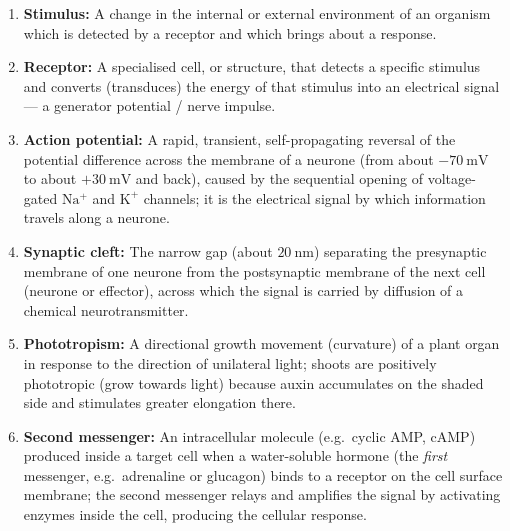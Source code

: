 \documentclass[11pt]{article}
\begin{document}
\begin{corrige}
\begin{enumerate}
\item \textbf{Stimulus:} A change in the internal or external environment of an organism which is detected by a receptor and which brings about a response.

\item \textbf{Receptor:} A specialised cell, or structure, that detects a specific stimulus and converts (transduces) the energy of that stimulus into an electrical signal — a generator potential / nerve impulse.

\item \textbf{Action potential:} A rapid, transient, self-propagating reversal of the potential difference across the membrane of a neurone (from about $-70\ \mathrm{mV}$ to about $+30\ \mathrm{mV}$ and back), caused by the sequential opening of voltage-gated $\mathrm{Na^+}$ and $\mathrm{K^+}$ channels; it is the electrical signal by which information travels along a neurone.

\item \textbf{Synaptic cleft:} The narrow gap (about $20\ \mathrm{nm}$) separating the presynaptic membrane of one neurone from the postsynaptic membrane of the next cell (neurone or effector), across which the signal is carried by diffusion of a chemical neurotransmitter.

\item \textbf{Phototropism:} A directional growth movement (curvature) of a plant organ in response to the direction of unilateral light; shoots are positively phototropic (grow towards light) because auxin accumulates on the shaded side and stimulates greater elongation there.

\item \textbf{Second messenger:} An intracellular molecule (e.g.\ cyclic AMP, cAMP) produced inside a target cell when a water-soluble hormone (the \emph{first} messenger, e.g.\ adrenaline or glucagon) binds to a receptor on the cell surface membrane; the second messenger relays and amplifies the signal by activating enzymes inside the cell, producing the cellular response.
\end{enumerate}
\end{corrige}
\end{document}
